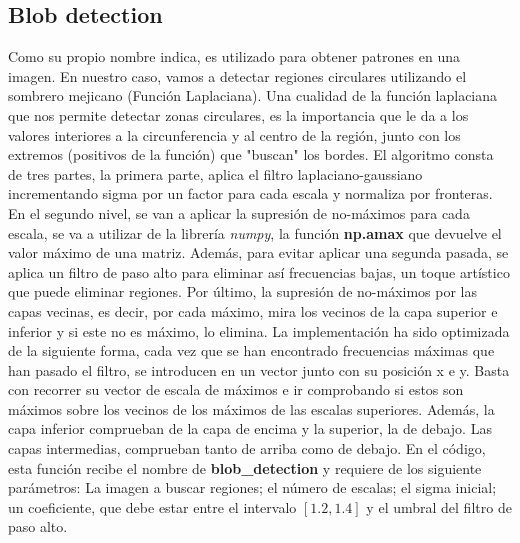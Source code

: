 \documentclass{article}
\begin{document}
\subsection{Blob detection}
Como su propio nombre indica, es utilizado para obtener patrones en una imagen. En nuestro caso, vamos a detectar regiones circulares utilizando el sombrero mejicano (Función Laplaciana). 
\newline\newline
Una cualidad de la función laplaciana que nos permite detectar zonas circulares, es la importancia que le da a los valores interiores a la circunferencia y al centro de la región, junto con los extremos (positivos de la función) que "buscan" los bordes. 
\newline\newline
El algoritmo consta de tres partes, la primera parte, aplica el filtro laplaciano-gaussiano incrementando sigma por un factor para cada escala y normaliza por fronteras. En el segundo nivel, se van a aplicar la supresión de no-máximos para cada escala, se va a utilizar de la librería \textit{numpy}, la función \textbf{np.amax} que devuelve el valor máximo de una matriz. Además, para evitar aplicar una segunda pasada, se aplica un filtro de paso alto para eliminar así frecuencias bajas, un toque artístico que puede eliminar regiones. Por último, la supresión de no-máximos por las capas vecinas, es decir, por cada máximo, mira los vecinos de la capa superior e inferior y si este no es máximo, lo elimina. 
\newline
\newline
La implementación ha sido optimizada de la siguiente forma, cada vez que se han encontrado frecuencias máximas que han pasado el filtro, se introducen en un vector junto con su posición x e y.
Basta con recorrer su vector de escala de máximos e ir comprobando si estos son máximos sobre los vecinos de los máximos de las escalas superiores. Además, la capa inferior comprueban de la capa de encima y la superior, la de debajo. Las capas intermedias, comprueban tanto de arriba como de debajo.
\newline
\newline
En el código, esta función recibe el nombre de \textbf{blob\_detection} y requiere de los siguiente parámetros: La imagen a buscar regiones; el número de escalas; el sigma inicial; un coeficiente, que debe estar entre el intervalo $\left[1.2, 1.4\right]$ y el umbral del filtro de paso alto.
\newline
\newline
\end{document}
